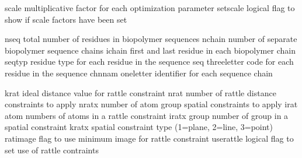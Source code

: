 \documentclass[letterpaper,11pt,english]{sphinxmanual}
\begin{document}
\begin{sphinxVerbatim}[commandchars=\\\{\}]
scale           multiplicative factor for each optimization parameter
set\PYGZus{}scale       logical flag to show if scale factors have been set
\end{sphinxVerbatim}


\begin{sphinxVerbatim}[commandchars=\\\{\}]
nseq            total number of residues in biopolymer sequences
nchain          number of separate biopolymer sequence chains
ichain          first and last residue in each biopolymer chain
seqtyp          residue type for each residue in the sequence
seq             three\PYGZhy{}letter code for each residue in the sequence
chnnam          one\PYGZhy{}letter identifier for each sequence chain
\end{sphinxVerbatim}


\begin{sphinxVerbatim}[commandchars=\\\{\}]
krat            ideal distance value for rattle constraint
nrat            number of rattle distance constraints to apply
nratx           number of atom group spatial constraints to apply
irat            atom numbers of atoms in a rattle constraint
iratx           group number of group in a spatial constraint
kratx           spatial constraint type (1=plane, 2=line, 3=point)
ratimage        flag to use minimum image for rattle constraint
use\PYGZus{}rattle      logical flag to set use of rattle contraints
\end{sphinxVerbatim}

\end{document}
